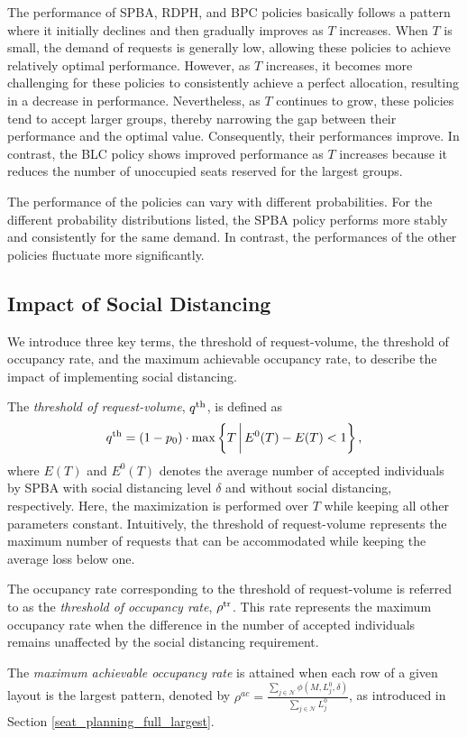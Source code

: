 The performance of SPBA, RDPH, and BPC policies basically follows a pattern where it initially declines and then gradually improves as $T$ increases. When $T$ is small, the demand of requests is generally low, allowing these policies to achieve relatively optimal performance. However, as $T$ increases, it becomes more challenging for these policies to consistently achieve a perfect allocation, resulting in a decrease in performance. Nevertheless, as $T$ continues to grow, these policies tend to accept larger groups, thereby narrowing the gap between their performance and the optimal value. Consequently, their performances improve. In contrast, the BLC policy shows improved performance as $T$ increases because it reduces the number of unoccupied seats reserved for the largest groups. 

The performance of the policies can vary with different probabilities. For the different probability distributions listed, the SPBA policy performs more stably and consistently for the same demand. In contrast, the performances of the other policies fluctuate more significantly.


\subsection{Impact of Social Distancing}\label{impact_sd}
We introduce three key terms, the threshold of request-volume, the threshold of occupancy rate, and the maximum achievable occupancy rate, to describe the impact of implementing social distancing.

The \textit{threshold of request-volume}, ${q}^{\textup{th}}$, is defined as 
\[
{q}^{\textup{th}} = (1- p_0) \cdot \max\left\{T \,\bigg|\, E^{0}(T) - E(T) < 1\right\},
\]
where $E(T)$ and $E^{0}(T)$ denotes the average number of accepted individuals by SPBA with social distancing level $\delta$ and without social distancing, respectively. Here, the maximization is performed over $T$ while keeping all other parameters constant.
Intuitively, the threshold of request-volume represents the maximum number of requests that can be accommodated while keeping the average loss below one.


The occupancy rate corresponding to the threshold of request-volume is referred to as the \textit{threshold of occupancy rate}, $\rho^{\textup{tr}}$. This rate represents the maximum occupancy rate when the difference in the number of accepted individuals remains unaffected by the social distancing requirement.

The \textit{maximum achievable occupancy rate} is attained when each row of a given layout is the largest pattern, denoted by $\rho^{ac} = \frac{\sum_{j \in \mathcal{N}}\phi(M, L_{j}^{0}, \delta)}{\sum_{j \in \mathcal{N}} L_{j}^{0}}$, as introduced in Section \ref{seat_planning_full_largest}.

